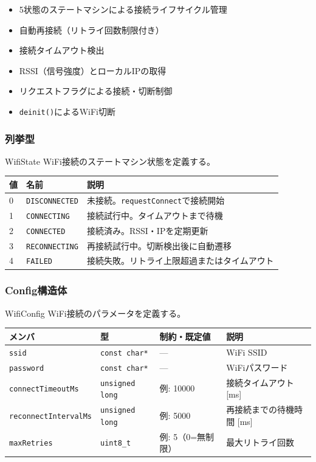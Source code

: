 \begin{itemize}
    \item 5状態のステートマシンによる接続ライフサイクル管理
    \item 自動再接続（リトライ回数制限付き）
    \item 接続タイムアウト検出
    \item RSSI（信号強度）とローカルIPの取得
    \item リクエストフラグによる接続・切断制御
    \item \texttt{deinit()}によるWiFi切断
\end{itemize}

\subsubsection{列挙型}

\begin{funcblock}{WifiState}
WiFi接続のステートマシン状態を定義する。

\begin{longtable}{l l p{6.0cm}}
\toprule
\textbf{値} & \textbf{名前} & \textbf{説明} \\
\midrule
\endhead
0 & \texttt{DISCONNECTED} & 未接続。\texttt{requestConnect}で接続開始 \\
1 & \texttt{CONNECTING}   & 接続試行中。タイムアウトまで待機 \\
2 & \texttt{CONNECTED}    & 接続済み。RSSI・IPを定期更新 \\
3 & \texttt{RECONNECTING} & 再接続試行中。切断検出後に自動遷移 \\
4 & \texttt{FAILED}       & 接続失敗。リトライ上限超過またはタイムアウト \\
\bottomrule
\end{longtable}
\end{funcblock}

\subsubsection{Config構造体}

\begin{funcblock}{WifiConfig}
WiFi接続のパラメータを定義する。

\begin{longtable}{l l l p{4.0cm}}
\toprule
\textbf{メンバ} & \textbf{型} & \textbf{制約・既定値} & \textbf{説明} \\
\midrule
\endhead
\texttt{ssid}                & \texttt{const char*}   & ---          & WiFi SSID \\
\texttt{password}            & \texttt{const char*}   & ---          & WiFiパスワード \\
\texttt{connectTimeoutMs}    & \texttt{unsigned long} & 例: 10000    & 接続タイムアウト [ms] \\
\texttt{reconnectIntervalMs} & \texttt{unsigned long} & 例: 5000     & 再接続までの待機時間 [ms] \\
\texttt{maxRetries}          & \texttt{uint8\_t}      & 例: 5（0=無制限）& 最大リトライ回数 \\
\bottomrule
\end{longtable}
\end{funcblock}

